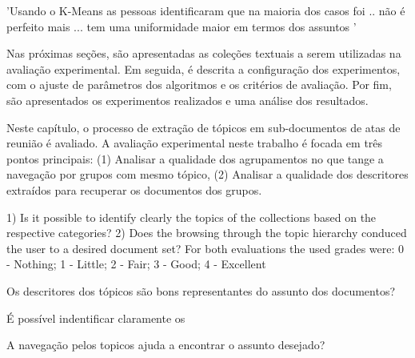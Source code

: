 


'Usando o K-Means as pessoas identificaram que na maioria dos casos foi .. não é perfeito mais ... tem uma uniformidade maior em termos dos assuntos '





Nas próximas seções, são apresentadas as coleções textuais a serem utilizadas na avaliação experimental. Em seguida, é descrita a configuração dos experimentos, com o ajuste de parâmetros dos algoritmos e os critérios de avaliação. Por fim, são apresentados os experimentos realizados e uma análise dos resultados.


Neste capítulo, o processo de extração de tópicos em sub-documentos de atas de reunião é avaliado. A avaliação experimental neste trabalho é focada em três pontos principais: 
(1) Analisar a qualidade dos agrupamentos no que tange a navegação por grupos com mesmo tópico, 
(2) Analisar a qualidade dos descritores extraídos para recuperar os documentos dos grupos.





1) Is it possible to identify clearly the topics of the collections
based on the respective categories?
2) Does the browsing through the topic hierarchy conduced
the user to a desired document set?
For both evaluations the used grades were:
0 - Nothing;
1 - Little;
2 - Fair;
3 - Good;
4 - Excellent


\item Os descritores dos tópicos são bons representantes do assunto dos documentos?
\item É possível indentificar claramente os 
\item A navegação pelos topicos ajuda a encontrar o assunto desejado?







%

%


